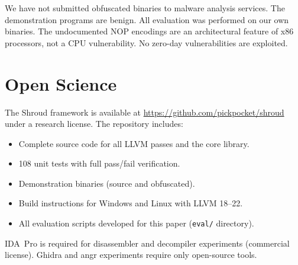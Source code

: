 \documentclass[letterpaper,twocolumn,10pt]{article}
\begin{document}
We have not submitted obfuscated binaries to malware analysis services. The demonstration programs are benign. All evaluation was performed on our own binaries. The undocumented NOP encodings are an architectural feature of x86 processors, not a CPU vulnerability. No zero-day vulnerabilities are exploited.

\cleardoublepage
\section*{Open Science}

The Shroud framework is available at \url{https://github.com/pickpocket/shroud} under a research license. The repository includes:

\begin{itemize}
\item Complete source code for all LLVM passes and the core library.
\item 108 unit tests with full pass/fail verification.
\item Demonstration binaries (source and obfuscated).
\item Build instructions for Windows and Linux with LLVM 18--22.
\item All evaluation scripts developed for this paper (\texttt{eval/} directory).
\end{itemize}

IDA~Pro is required for disassembler and decompiler experiments (commercial license). Ghidra and angr experiments require only open-source tools.

\cleardoublepage


\end{document}
